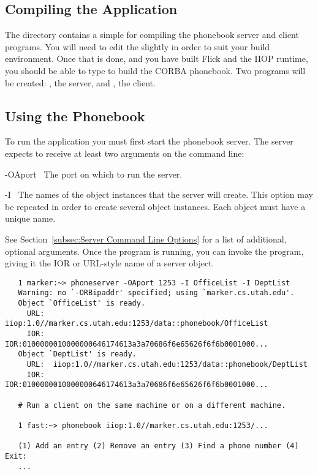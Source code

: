 

\subsection{Compiling the Application}
\label{subsec:CORBA:Compiling the Application}

The  directory contains a simple
 for compiling the phonebook server and client programs.
You will need to edit the  slightly in order to suit your
build environment.  Once that is done, and you have built Flick and the IIOP
runtime, you should be able to type  to build the CORBA
phonebook.  Two programs will be created: , the server,
and , the client.



\subsection{Using the Phonebook}
\label{subsec:CORBA:Using the Phonebook}

To run the application you must first start the phonebook server.  The server
expects to receive at least two arguments on the command line:

\begin{optionlist}
  \item[-OAport~\optionarg{portnumber}]
  The port on which to run the server.

  \item[-I~\optionarg{name}]
  The names of the object instances that the server will create.  This option
  may be repeated in order to create several object instances.  Each object
  must have a unique name.
\end{optionlist}

\noindent See Section~\ref{subsec:Server Command Line Options} for a list of
additional, optional arguments.  Once the  program is
running, you can invoke the  program, giving it the IOR or
URL-style name of a server object.

\begin{verbatim}
   1 marker:~> phoneserver -OAport 1253 -I OfficeList -I DeptList
   Warning: no `-ORBipaddr' specified; using `marker.cs.utah.edu'.
   Object `OfficeList' is ready.
     URL:  iiop:1.0//marker.cs.utah.edu:1253/data::phonebook/OfficeList
     IOR:  IOR:0100000010000000646174613a3a70686f6e65626f6f6b0001000...
   Object `DeptList' is ready.
     URL:  iiop:1.0//marker.cs.utah.edu:1253/data::phonebook/DeptList
     IOR:  IOR:0100000010000000646174613a3a70686f6e65626f6f6b0001000...

   # Run a client on the same machine or on a different machine.

   1 fast:~> phonebook iiop:1.0//marker.cs.utah.edu:1253/...

   (1) Add an entry (2) Remove an entry (3) Find a phone number (4) Exit:
   ...
\end{verbatim}




